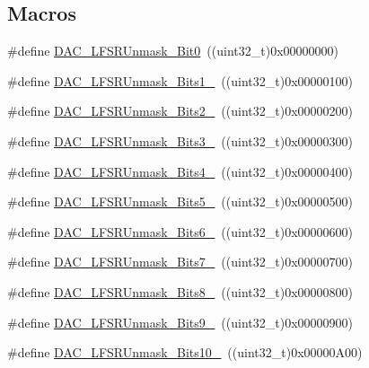 \subsection*{Macros}
\begin{DoxyCompactItemize}
\item 
\#define \hyperlink{group___d_a_c__lfsrunmask__triangleamplitude_ga60794fd5092a332cfa82e1cee13945fc}{D\+A\+C\+\_\+\+L\+F\+S\+R\+Unmask\+\_\+\+Bit0}~((uint32\+\_\+t)0x00000000)
\item 
\#define \hyperlink{group___d_a_c__lfsrunmask__triangleamplitude_ga09f47cfa563252a1add4662284350c07}{D\+A\+C\+\_\+\+L\+F\+S\+R\+Unmask\+\_\+\+Bits1\+\_}~((uint32\+\_\+t)0x00000100)
\item 
\#define \hyperlink{group___d_a_c__lfsrunmask__triangleamplitude_ga60b800857b7e33d9c0be2846fc56849f}{D\+A\+C\+\_\+\+L\+F\+S\+R\+Unmask\+\_\+\+Bits2\+\_}~((uint32\+\_\+t)0x00000200)
\item 
\#define \hyperlink{group___d_a_c__lfsrunmask__triangleamplitude_gafe219362b3a48d8678a65ef38cb45532}{D\+A\+C\+\_\+\+L\+F\+S\+R\+Unmask\+\_\+\+Bits3\+\_}~((uint32\+\_\+t)0x00000300)
\item 
\#define \hyperlink{group___d_a_c__lfsrunmask__triangleamplitude_ga2543d802e19d592a26c8231be663cdac}{D\+A\+C\+\_\+\+L\+F\+S\+R\+Unmask\+\_\+\+Bits4\+\_}~((uint32\+\_\+t)0x00000400)
\item 
\#define \hyperlink{group___d_a_c__lfsrunmask__triangleamplitude_ga71a01660d410823bfe76a603080dc125}{D\+A\+C\+\_\+\+L\+F\+S\+R\+Unmask\+\_\+\+Bits5\+\_}~((uint32\+\_\+t)0x00000500)
\item 
\#define \hyperlink{group___d_a_c__lfsrunmask__triangleamplitude_ga48fe2d3f4274d6bf28e446ca0001ed5d}{D\+A\+C\+\_\+\+L\+F\+S\+R\+Unmask\+\_\+\+Bits6\+\_}~((uint32\+\_\+t)0x00000600)
\item 
\#define \hyperlink{group___d_a_c__lfsrunmask__triangleamplitude_gaf0a93c1ee1e13776fae7558b36243431}{D\+A\+C\+\_\+\+L\+F\+S\+R\+Unmask\+\_\+\+Bits7\+\_}~((uint32\+\_\+t)0x00000700)
\item 
\#define \hyperlink{group___d_a_c__lfsrunmask__triangleamplitude_ga4f56965841d9d91ca5b6de43ee589598}{D\+A\+C\+\_\+\+L\+F\+S\+R\+Unmask\+\_\+\+Bits8\+\_}~((uint32\+\_\+t)0x00000800)
\item 
\#define \hyperlink{group___d_a_c__lfsrunmask__triangleamplitude_gaf7f4540d9ec6efe074e1e4485f9a347a}{D\+A\+C\+\_\+\+L\+F\+S\+R\+Unmask\+\_\+\+Bits9\+\_}~((uint32\+\_\+t)0x00000900)
\item 
\#define \hyperlink{group___d_a_c__lfsrunmask__triangleamplitude_ga7670f0e10f062571d0e56027ef653228}{D\+A\+C\+\_\+\+L\+F\+S\+R\+Unmask\+\_\+\+Bits10\+\_}~((uint32\+\_\+t)0x00000\+A00)

\end{DoxyCompactItemize}
